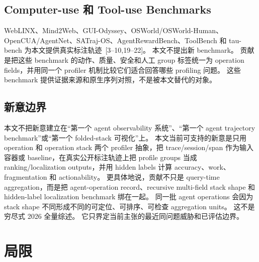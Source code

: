 \documentclass[10pt,twocolumn]{ctexart}
\begin{document}
\subsection{Computer-use 和 Tool-use Benchmarks}
WebLINX、Mind2Web、GUI-Odyssey、OSWorld/OSWorld-Human、OpenCUA/AgentNet、SATraj-OS、AgentRewardBench、ToolBench 和 tau-bench 为本文提供真实标注轨迹~[3--10,19--22]。
本文不提出新 benchmark。
贡献是把这些 benchmark 的动作、质量、安全和人工 group 标签统一为 operation fields，并用同一个 profiler 机制比较它们适合回答哪些 profiling 问题。
这些 benchmark 提供证据来源和原生序列对照，不是被本文替代的对象。

\subsection{新意边界}
本文不把新意建立在“第一个 agent observability 系统”、“第一个 agent trajectory benchmark”或“第一个 folded-stack 可视化”上。
本文当前可支持的新意是只用 operation 和 operation stack 两个 profiler 抽象，把 trace/session/span 作为输入容器或 baseline，在真实公开标注轨迹上把 profile groups 当成 ranking/localization outputs，并用 hidden labels 计算 accuracy、work、fragmentation 和 actionability。
更具体地说，贡献不只是 query-time aggregation，而是把 agent-operation record、recursive multi-field stack shape 和 hidden-label localization benchmark 绑在一起。
同一批 agent operations 会因为 stack shape 不同形成不同的可定位、可排序、可检查 aggregation units。
这不是穷尽式 2026 全量综述。
它只界定当前主张的最近同问题威胁和已评估边界。

\section{局限}
\end{document}
